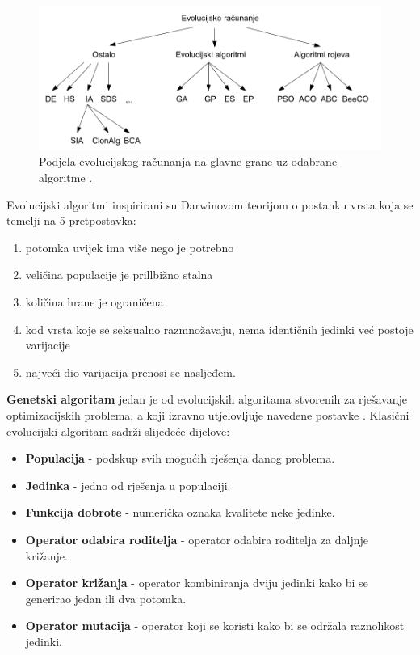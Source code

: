 \documentclass[times, utf8, zavrsni]{fer}
\begin{document}
\begin{figure}[htb]
\centering
\includegraphics[width=15cm]{images/evolucijske_grane.png}
\caption{Podjela evolucijskog računanja na glavne grane uz odabrane algoritme \citep{cupic-disertacija}.}
\label{fig:evolucijske_grane}
\end{figure}

Evolucijski algoritmi inspirirani su Darwinovom teorijom o postanku vrsta koja se temelji na 5 pretpostavka:

\begin{enumerate}
	\item potomka uvijek ima više nego je potrebno
	\item veličina populacije je prillbižno stalna
	\item količina hrane je ograničena
	\item kod vrsta koje se seksualno razmnožavaju, nema identičnih jedinki već postoje varijacije
	\item najveći dio varijacija prenosi se nasljeđem.
\end{enumerate}

	\textbf{Genetski algoritam} jedan je od evolucijskih algoritama stvorenih za rješavanje optimizacijskih problema, a koji izravno utjelovljuje navedene postavke \citep{cupic-skripta}.  Klasični evolucijski algoritam sadrži slijedeće dijelove:
	
\begin{itemize}
	\item \textbf{Populacija} - podskup svih mogućih rješenja danog problema.
	\item \textbf{Jedinka} - jedno od rješenja u populaciji.
	\item \textbf{Funkcija dobrote} - numerička oznaka kvalitete neke jedinke.
	\item \textbf{Operator odabira roditelja} - operator odabira roditelja za daljnje križanje.
	\item \textbf{Operator križanja} - operator kombiniranja dviju jedinki kako bi se generirao jedan ili dva potomka.
	\item \textbf{Operator mutacija} - operator koji se koristi kako bi se održala raznolikost jedinki.
\end{itemize}
\end{document}
